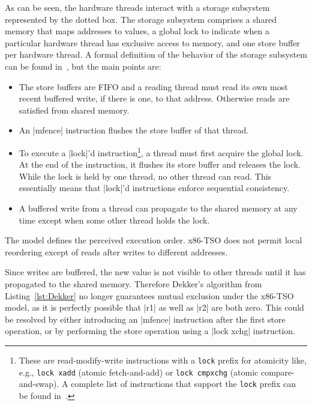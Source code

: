 \documentclass[a4paper,12pt,notitlepage,twoside,openright]{article}
\begin{document}
As can be seen, the hardware threads interact with a storage subsystem
represented by the dotted box. The storage subsystem comprises a
shared memory that maps addresses to values, a global lock to indicate
when a particular hardware thread has exclusive access to memory, and
one store buffer per hardware thread. A formal definition of the
behavior of the storage subsystem can be found
in~\cite{Sewell:2010:XRU:1785414.1785443}, but the main points are:
\begin{itemize}
	\item The store buffers are FIFO and a reading thread must
          read its own most recent buffered write, if there is one, to
          that address. Otherwise reads are satisfied from shared
          memory.
	\item An |mfence| instruction flushes the store buffer of that
          thread.
	\item To execute a |lock|'d instruction\footnote{These are
          read-modify-write instructions with a \texttt{lock} prefix
          for atomicity like, e.g., \texttt{lock xadd} (atomic
          fetch-and-add) or \texttt{lock cmpxchg} (atomic
          compare-and-swap). A complete list of instructions that
          support the \texttt{lock} prefix can be found
          in~\cite[8.1.2.2]{Intel:2016:Volume3}.}, a thread must first
          acquire the global lock. At the end of the instruction, it
          flushes its store buffer and releases the lock. While the
          lock is held by one thread, no other thread can read. This
          essentially means that |lock|'d instructions enforce
          sequential consistency.
	\item A buffered write from a thread can propagate to the
          shared memory at any time except when some other thread
          holds the lock.
\end{itemize}

The model defines the perceived execution order. x86-TSO does not
permit local reordering except of reads after writes to different
addresses.

Since writes are buffered, the new value is not visible to other
threads until it has propagated to the shared memory. Therefore
Dekker's algorithm from Listing~\ref{lst:Dekker} no longer guarantees
mutual exclusion under the x86-TSO model, as it is perfectly possible
that |r1| as well as |r2| are both zero. This could be resolved by
either introducing an |mfence| instruction after the first store
operation, or by performing the store operation using a |lock xchg|
instruction.
\end{document}
